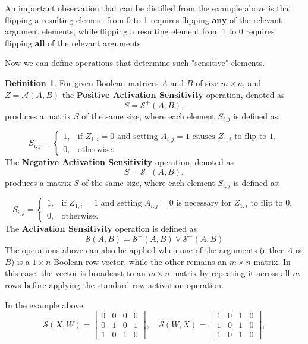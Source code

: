 \documentclass{article}
\theoremstyle{definition}
\newtheorem*{definition}{Definition}
\theoremstyle{remark}
\begin{document}
An important observation that can be distilled from the example above is that flipping a resulting element from 0 to 1 requires flipping \textbf{any} of the relevant argument elements, while flipping a resulting element from 1 to 0 requires flipping \textbf{all} of the relevant arguments.

Now we can define operations that determine such "sensitive" elements.

\begin{definition}
    For given Boolean matrices \( A \) and \( B \) of size \( m \times n \), and \( Z = \mathcal{A}(A, B) \) the \textbf{Positive Activation Sensitivity} operation, denoted as
    \[
        S = \mathcal{S}^+(A, B),
    \]
    produces a matrix \( S \) of the same size, where each element \( S_{i,j} \) is defined as:

    \[
        S_{i,j} =
        \begin{cases}
            1, & \text{if } Z_{1,i} = 0 \text{ and setting } A_{i,j} = 1 \text{ causes } Z_{1,i} \text{ to flip to } 1, \\
            0, & \text{otherwise}.
        \end{cases}
    \]
    The \textbf{Negative Activation Sensitivity} operation, denoted as
    \[
        S = \mathcal{S}^-(A, B),
    \]
    produces a matrix \( S \) of the same size, where each element \( S_{i,j} \) is defined as:

    \[
        S_{i,j} =
        \begin{cases}
            1, & \text{if } Z_{1,i} = 1 \text{ and setting } A_{i,j} = 0 \text{ is necessary for } Z_{1,i} \text{ to flip to }  0, \\
            0, & \text{otherwise}.
        \end{cases}
    \]
    The \textbf{Activation Sensitivity} operation is defined as
    \[
        \mathcal{S}(A, B) = \mathcal{S}^+(A, B) \vee \mathcal{S}^-(A, B)
    \]
    The operations above can also be applied when one of the arguments (either \( A \) or \( B \)) is a \( 1 \times n \) Boolean row vector, while the other remains an \( m \times n \) matrix. In this case, the vector is broadcast to an \( m \times n \) matrix by repeating it across all \( m \) rows before applying the standard row activation operation.
\end{definition}

In the example above:
\[
    \mathcal{S}(X, W) = \begin{bmatrix} 0 & 0 & 0 & 0 \\ 0 & 1 & 0 & 1 \\ 1 & 0 & 1 & 0 \end{bmatrix},\quad
    \mathcal{S}(W, X) = \begin{bmatrix} 1 & 0 & 1 & 0 \\ 1 & 0 & 1 & 0 \\ 1 & 0 & 1 & 0 \end{bmatrix},
\]
\end{document}
